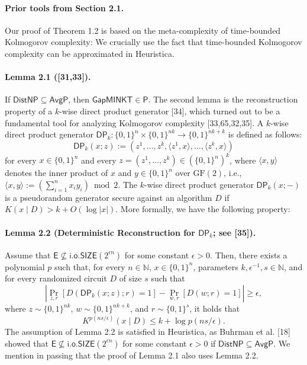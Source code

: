 \documentclass[10pt,a4paper]{article}
\begin{document}
\paragraph{Prior tools from Section 2.1.}
Our proof of Theorem 1.2 is based on the meta-complexity of time-bounded Kolmogorov complexity: We crucially use the fact that time-bounded Kolmogorov complexity can be approximated in Heuristica.
\paragraph{Lemma 2.1 ([31,33]).}
If $\mathsf{DistNP}\subseteq\mathsf{AvgP}$, then $\mathsf{GapMINKT}\in\mathsf P$.
The second lemma is the reconstruction property of a $k$-wise direct product generator [34], which turned out to be a fundamental tool for analyzing Kolmogorov complexity [33,65,32,35]. A $k$-wise direct product generator $\mathsf{DP}_k:\{0,1\}^n\times\{0,1\}^{nk}\to\{0,1\}^{nk+k}$ is defined as follows:
\[\mathsf{DP}_k(x;z):=(z^1,\ldots,z^k,\langle z^1,x\rangle,\ldots,\langle z^k,x\rangle)\]
for every $x\in\{0,1\}^n$ and every $z=(z^1,\ldots,z^k)\in(\{0,1\}^n)^k$, where $\langle x,y\rangle$ denotes the inner product of $x$ and $y\in\{0,1\}^n$ over $\mathrm{GF}(2)$, i.e., $\langle x,y\rangle:=(\sum_{i=1}^nx_iy_i)\bmod2$. The $k$-wise direct product generator $\mathsf{DP}_k(x;-)$ is a pseudorandom generator secure against an algorithm $D$ if $K(x\mid D)>k+O(\log|x|)$. More formally, we have the following property:
\paragraph{Lemma 2.2 (Deterministic Reconstruction for $\mathsf{DP}_k$; see [35]).}
Assume that $\mathsf E\not\subseteq\mathsf{i.o.SIZE}(2^{\epsilon n})$ for some constant $\epsilon>0$. Then, there exists a polynomial $p$ such that, for every $n\in\mathbb N$, $x\in\{0,1\}^n$, parameters $k,\epsilon^{-1},s\in\mathbb N$, and for every randomized circuit $D$ of size $s$ such that
\[\left|\Pr_{z,r}[D(\mathsf{DP}_k(x;z);r)=1]-\Pr_{w,r}[D(w;r)=1]\right|\geq\epsilon,\]
where $z\sim\{0,1\}^{nk}$, $w\sim\{0,1\}^{nk+k}$, and $r\sim\{0,1\}^s$, it holds that
\[K^{p(ns/\epsilon)}(x\mid D)\leq k+\log p(ns/\epsilon).\]
The assumption of Lemma 2.2 is satisfied in Heuristica, as Buhrman et al. [18] showed that $\mathsf E\not\subseteq\mathsf{i.o.SIZE}(2^{\epsilon n})$ for some constant $\epsilon>0$ if $\mathsf{DistNP}\subseteq\mathsf{AvgP}$. We mention in passing that the proof of Lemma 2.1 also uses Lemma 2.2.
\end{document}
